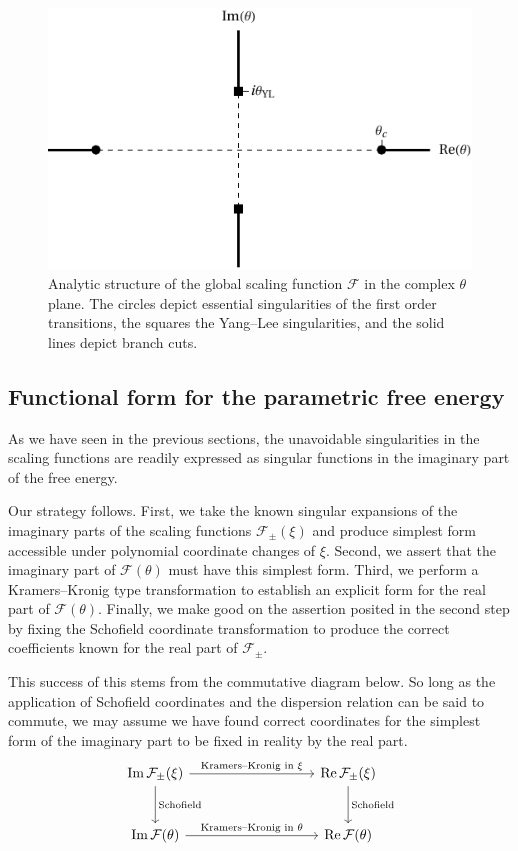 \documentclass[
  aps,
  pre,
  preprint,
  longbibliography,
  floatfix
]{revtex4-2}
\begin{document}
\begin{figure}
  \includegraphics{figs/F_theta_singularities.pdf}
  \caption{
    Analytic structure of the global scaling function $\mathcal F$ in the
    complex $\theta$ plane. The circles depict essential singularities of the
    first order transitions, the squares the Yang--Lee singularities, and the
    solid lines depict branch cuts.
  } \label{fig:schofield.singularities}
\end{figure}

\subsection{Functional form for the parametric free energy}

As we have seen in the previous sections, the unavoidable singularities in the
scaling functions are readily expressed as singular functions in the imaginary
part of the free energy.

Our strategy follows. First, we take the known singular expansions of the imaginary parts of the scaling functions $\mathcal F_{\pm}(\xi)$ and produce simplest form accessible under polynomial coordinate changes of $\xi$. Second, we assert that the imaginary part of $\mathcal F(\theta)$ must have this simplest form. Third, we perform a Kramers--Kronig type transformation to establish an explicit form for the real part of $\mathcal F(\theta)$. Finally, we make good on the assertion posited in the second step by fixing the Schofield coordinate transformation to produce the correct coefficients known for the real part of $\mathcal F_{\pm}$.

This success of this stems from the commutative diagram below. So long as the
application of Schofield coordinates and the dispersion relation can be said to
commute, we may assume we have found correct coordinates for the simplest form
of the imaginary part to be fixed in reality by the real part.
\[
  \begin{tikzcd}[row sep=large, column sep = 9em]
  \operatorname{Im}\mathcal F_\pm(\xi) \arrow{r}{\text{Kramers--Kronig in $\xi$}} \arrow[]{d}{\text{Schofield}} & \operatorname{Re}\mathcal F_{\pm}(\xi) \arrow{d}{\text{Schofield}} \\%
  \operatorname{Im}\mathcal F(\theta) \arrow{r}{\text{Kramers--Kronig in $\theta$}}& \operatorname{Re}\mathcal F(\theta)
\end{tikzcd}
\]
\end{document}
